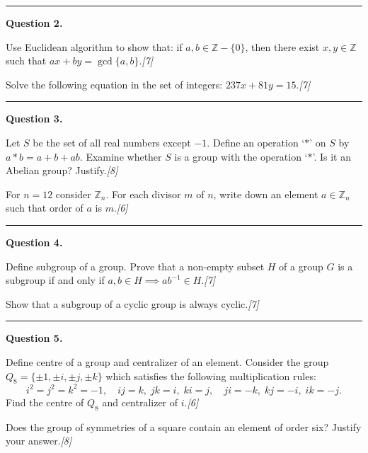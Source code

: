 \documentclass[11pt,a4paper]{article}
\newcommand{\pts}[1]{\hfill   \textit{[#1]}}
\begin{document}
\medskip\rule{\linewidth}{0.2pt}\medskip




\noindent   \textbf{Question 2.}

\begin{parts}
  \item Use Euclidean algorithm to show that: if $a, b \in \mathbb{Z} - \{0\}$, then there exist $x, y \in \mathbb{Z}$ such that $ax + by = \gcd\{a, b\}$.\pts{7}
  \item Solve the following equation in the set of integers: $237x + 81y = 15$.\pts{7}
\end{parts}

\medskip\rule{\linewidth}{0.2pt}\medskip




\noindent   \textbf{Question 3.}

\begin{parts}
  \item Let $S$ be the set of all real numbers except $-1$. Define an operation `$*$' on $S$ by $a * b = a + b + ab$. Examine whether $S$ is a group with the operation `$*$'. Is it an Abelian group? Justify.\pts{8}
  \item For $n = 12$ consider $\mathbb{Z}_n$. For each divisor $m$ of $n$, write down an element $a \in \mathbb{Z}_n$ such that order of $a$ is $m$.\pts{6}
\end{parts}

\medskip\rule{\linewidth}{0.2pt}\medskip




\noindent   \textbf{Question 4.}

\begin{parts}
  \item Define subgroup of a group. Prove that a non-empty subset $H$ of a group $G$ is a subgroup if and only if $a, b \in H \implies ab^{-1} \in H$.\pts{7}
  \item Show that a subgroup of a cyclic group is always cyclic.\pts{7}
\end{parts}

\medskip\rule{\linewidth}{0.2pt}\medskip




\noindent   \textbf{Question 5.}

\begin{parts}
  \item Define centre of a group and centralizer of an element. Consider the group $Q_8 = \{\pm 1, \pm i, \pm j, \pm k\}$ which satisfies the following multiplication rules:
  \[
    i^2 = j^2 = k^2 = -1, \quad ij = k, \; jk = i, \; ki = j, \quad ji = -k, \; kj = -i, \; ik = -j.
  \]
  Find the centre of $Q_8$ and centralizer of $i$.\pts{6}
  \item Does the group of symmetries of a square contain an element of order six? Justify your answer.\pts{8}
\end{parts}
\end{document}

